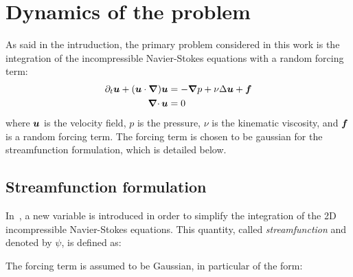 \documentclass[../main.tex]{subfiles}
\begin{document}
\section{Dynamics of the problem}
As said in the intruduction, the primary problem considered in this work is the integration of the incompressible Navier-Stokes equations with a random forcing term:
\begin{align}
	\partial_t \boldsymbol{u} + (\boldsymbol{u} \cdot \grad) \boldsymbol{u} & = -\grad p + \nu\Delta \boldsymbol{u} + \boldsymbol{f} \\
	\operatorname{\boldsymbol{\nabla}\cdot}{\boldsymbol{u}}                                   & = 0
\end{align}
where $\boldsymbol{u}$ is the velocity field, $p$ is the pressure, $\nu$ is the kinematic viscosity, and $\boldsymbol{f}$ is a random forcing term. The forcing term is chosen to be gaussian for the streamfunction formulation, which is detailed below.

\subsection{Streamfunction formulation}
In~\cite{Batchelor2000}, a new variable is introduced in order to simplify the integration of the 2D incompressible Navier-Stokes equations. This quantity, called \emph{streamfunction} and denoted by $\psi$, is defined as:

The forcing term is assumed to be Gaussian, in particular of the form:
\end{document}
